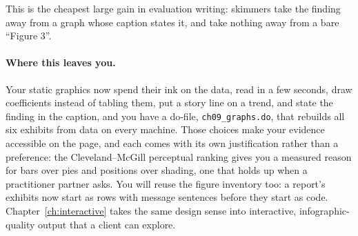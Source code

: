 This is the cheapest large gain in evaluation writing: skimmers take the finding away from a graph whose caption states it, and take nothing away from a bare \enquote{Figure 3}.

\paragraph{Where this leaves you.} Your static graphics now spend their ink on the data, read in a few seconds, draw coefficients instead of tabling them, put a story line on a trend, and state the finding in the caption, and you have a do-file, \texttt{ch09\_graphs.do}, that rebuilds all six exhibits from data on every machine. Those choices make your evidence accessible on the page, and each comes with its own justification rather than a preference: the Cleveland--McGill perceptual ranking gives you a measured reason for bars over pies and positions over shading, one that holds up when a practitioner partner asks. You will reuse the figure inventory too: a report's exhibits now start as rows with message sentences before they start as code. Chapter~\ref{ch:interactive} takes the same design sense into interactive, infographic-quality output that a client can explore.

